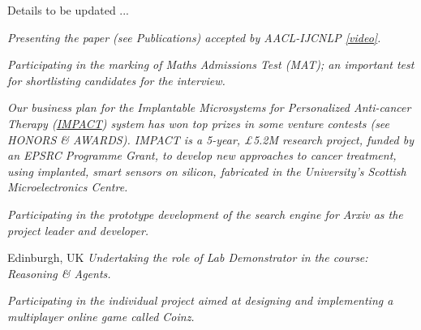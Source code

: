 \documentclass[%
               doublesided,
               paper=a4,
               fontsize=11pt
              ]{my-resume}
\begin{document}
{\small Details to be updated ...}

\divider 

\textit{\small Presenting the paper (see Publications) accepted by AACL-IJCNLP \href{https://www.youtube.com/watch?v=VzcCkX_MjWU&t=15s}{[video]}.}

\divider 

\textit{\small Participating in the marking of Maths Admissions Test (MAT); an important test for shortlisting candidates for the interview.}

\divider 

\textit{\small Our business plan for the Implantable Microsystems for Personalized Anti-cancer Therapy (\href{https://www.eng.ed.ac.uk/research/projects/impact-implantable-microsystems-personalised-anti-cancer-therapy}{IMPACT}) system has won top prizes in some venture contests (see HONORS \& AWARDS). IMPACT is a 5-year, £5.2M research project, funded by an EPSRC Programme Grant, to develop new approaches
to cancer treatment, using implanted, smart sensors on silicon, fabricated in the University’s Scottish Microelectronics Centre.}

\divider

\textit{\small Participating in the prototype development of the search engine for Arxiv as the project leader and developer.}


\divider

  {Edinburgh, UK}
\textit{\small Undertaking the role of Lab Demonstrator in the course: Reasoning \& Agents.}

\divider

\textit{\small Participating in the individual project aimed at designing and implementing a multiplayer online game called Coinz.}   
\end{document}
